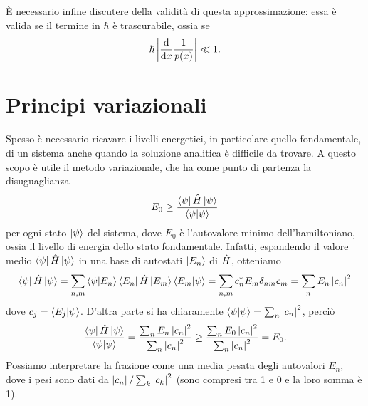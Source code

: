 È necessario infine discutere della validità di questa approssimazione: essa è valida se il termine in $\hbar$ è trascurabile, ossia se
\begin{equation}
	\hbar\left|{\frac{\textup{d} {}}{\textup{d} {x}}\frac1{p(x)}}\right|\ll 1.
	\label{eq:condizione-approssimazione-WKB}
\end{equation}

\section{Principi variazionali}
Spesso è necessario ricavare i livelli energetici, in particolare quello fondamentale, di un sistema anche quando la soluzione analitica è difficile da trovare.
A questo scopo è utile il metodo variazionale, che ha come punto di partenza la disuguaglianza
\begin{equation}
	E_0\ge\frac{\left\langle{\psi}\right|\hat{H}\left|{\psi}\right\rangle}{\left\langle{\psi}\middle|{\psi}\right\rangle}
	\label{eq:principio-variazionale}
\end{equation}
per ogni stato $\left|{\psi}\right\rangle$ del sistema, dove $E_0$ è l'autovalore minimo dell'hamiltoniano, ossia il livello di energia dello stato fondamentale.
Infatti, espandendo il valore medio $\left\langle{\psi}\right|\hat{H}\left|{\psi}\right\rangle$ in una base di autostati $\left|{E_n}\right\rangle$ di $\hat{H}$, otteniamo
\begin{equation}
	\left\langle{\psi}\right|\hat{H}\left|{\psi}\right\rangle=\sum_{n,m}\left\langle{\psi}\middle|{E_n}\right\rangle\left\langle{E_n}\right|\hat{H}\left|{E_m}\right\rangle\left\langle{E_m}\middle|{\psi}\right\rangle=\sum_{n,m}c_n^*E_m\delta_{nm}c_m=\sum_nE_n\left|{c_n}\right|^2
\end{equation}
dove $c_j=\left\langle{E_j}\middle|{\psi}\right\rangle$.
D'altra parte si ha chiaramente $\left\langle{\psi}\middle|{\psi}\right\rangle=\sum_n\left|{c_n}\right|^2$, perciò
\begin{equation}
	\frac{\left\langle{\psi}\right|\hat{H}\left|{\psi}\right\rangle}{\left\langle{\psi}\middle|{\psi}\right\rangle}=\frac{\sum_nE_n\left|{c_n}\right|^2}{\sum_n\left|{c_n}\right|^2}\ge\frac{\sum_nE_0\left|{c_n}\right|^2}{\sum_n\left|{c_n}\right|^2}=E_0.
\end{equation}
Possiamo interpretare la frazione come una media pesata degli autovalori $E_n$, dove i pesi sono dati da $\left|{c_n}\right|/\sum_k\left|{c_k}\right|^2$ (sono compresi tra 1 e 0 e la loro somma è 1).

